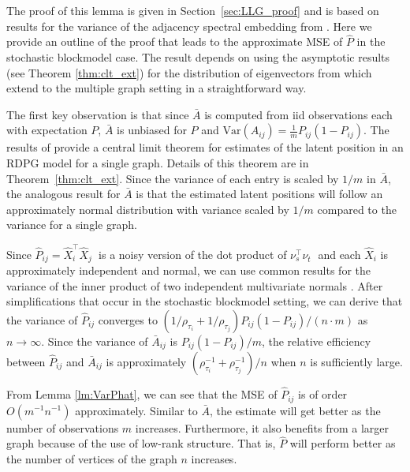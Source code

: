 The proof of this lemma is given in Section~\ref{sec:LLG_proof} and is based on results for the variance of the adjacency spectral embedding from \citet{athreya2016limit}.
Here we provide an outline of the proof that leads to the approximate MSE of $\hat{P}$ in the stochastic blockmodel case.
The result depends on using the asymptotic results (see Theorem \ref{thm:clt_ext}) for the distribution of eigenvectors from \citet{athreya2016limit} which extend to the multiple graph setting in a straightforward way.\\
\begin{proofoutline}
The first key observation is that since $\bar{A}$ is computed from iid observations each with expectation $P$, $\bar{A}$ is unbiased for $P$ and $\mathrm{Var}(A_{ij}) = \frac{1}{m}P_{ij}(1-P_{ij})$.
The results of \citet{athreya2016limit} provide a central limit theorem for estimates of the latent position in an RDPG model for a single graph. Details of this theorem are in Theorem~\ref{thm:clt_ext}.
Since the variance of each entry is scaled by $1/m$ in $\bar{A}$, the analogous result for $\bar{A}$ is that the estimated latent positions will follow an approximately normal distribution with variance scaled by $1/m$ compared to the variance for a single graph. 

Since $\hat{P}_{ij} = \hat{X}_i^{\top} \hat{X}_j^{\phantom{\top}}$ is a noisy version of the dot product of $\nu_s^{\top} \nu_t^{\phantom{\top}}$ and each $\hat{X}_i$ is approximately independent and normal, we can use common results for the variance of the inner product of two independent multivariate normals \citep{brown1977means}.
After simplifications that occur in the stochastic blockmodel setting, we can derive that the variance of $\hat{P}_{ij}$ converges to $\left( 1/\rho_{\tau_i} + 1/\rho_{\tau_j} \right) P_{ij} (1-P_{ij})/(n \cdot m)$ as $n \to \infty$. 
Since the variance of $\bar{A}_{ij}$ is $P_{ij} (1-P_{ij})/m$, the relative efficiency between $\hat{P}_{ij}$ and $\bar{A}_{ij}$ is approximately $(\rho_{\tau_i}^{-1} + \rho_{\tau_j}^{-1})/n$ when $n$ is sufficiently large.
\end{proofoutline}

From Lemma \ref{lm:VarPhat}, we can see that the MSE of $\hat{P}_{ij}$ is of order $O(m^{-1} n^{-1})$ approximately. Similar to $\bar{A}$, the estimate will get better as the number of observations $m$ increases. Furthermore, it also benefits from a larger graph because of the use of low-rank structure. That is, $\hat{P}$ will perform better as the number of vertices of the graph $n$ increases.

